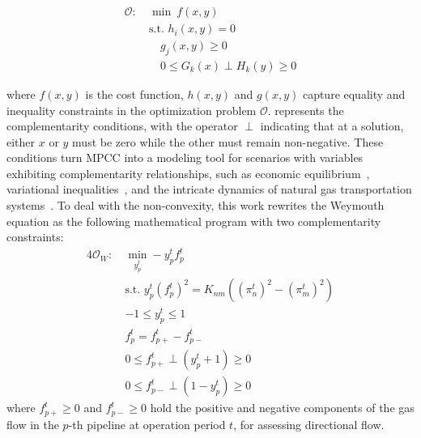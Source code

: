 \begin{subequations}
\begin{alignat}{4}
\mathcal{O}: \ &\min \ f(x, y) \\
&\text{s.t. } h_i(x, y) = 0 \\
&\quad g_j(x, y) \geq 0 \\
&\quad 0 \leq G_k(x) \perp H_k(y) \geq 0 \label{eq:complementarity}
\end{alignat}
\end{subequations}

where $f(x, y)$ is the cost function, $h(x,y)$ and $g(x,y)$ capture equality and inequality constraints in the optimization problem $\mathcal{O}$.  represents the complementarity conditions, with the operator $\perp$ indicating that at a solution, either $x$ or $y$ must be zero while the other must remain non-negative. These conditions turn MPCC into a modeling tool for scenarios with variables exhibiting complementarity relationships, such as economic equilibrium~\citep{MPCC_advantages}, variational inequalities~\citep{Hintermüller_Kopacka_2009}, and the intricate dynamics of natural gas transportation systems~\citep{Hante_Schmidt_2019}.
To deal with the non-convexity, this work rewrites the Weymouth equation as the following mathematical program with two complementarity constraints:
\begin{alignat}{4}
\label{eq:complementarity_relaxec3}
\mathcal{O}_W: \ &\min\limits_{y_p^t} -y_p^tf_{p}^t \\
& \text{s.t. } y_p^t(f_{p}^t)^2 = K_{nm}((\pi_{n}^t)^2-(\pi_{m}^t)^2)\nonumber\\
& -1 \leq y_p^t \leq 1 \nonumber\\
&f_{p}^t = f_{p+}^t - f_{p-}^t\nonumber\\
& 0 \leq f_{p+}^t \perp (y_p^t+1) \geq 0 \nonumber\\
& 0 \leq f_{p-}^t \perp (1-y_p^t) \geq 0 \nonumber
\end{alignat}
where $f_{p+}^t\geq0$ and $f_{p-}^t\geq0$ hold the positive and negative components of the gas flow in the $p$-th pipeline at operation period $t$, for assessing directional flow.


